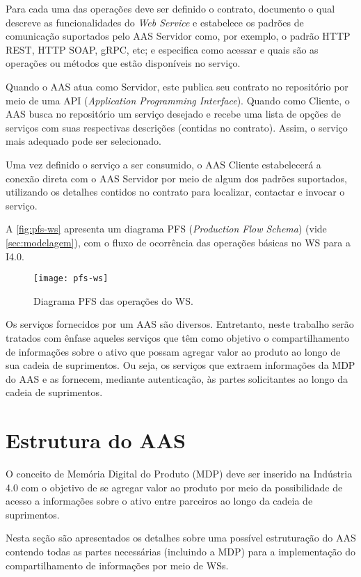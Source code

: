 Para cada uma das operações deve ser definido o contrato, documento o qual descreve as funcionalidades do \textit{Web Service} e estabelece os padrões de comunicação suportados pelo AAS Servidor como, por exemplo, o padrão HTTP REST, HTTP SOAP, gRPC, etc; e especifica como acessar e quais são as operações ou métodos que estão disponíveis no serviço.

Quando o AAS atua como Servidor, este publica seu contrato no repositório por meio de uma API (\textit{Application Programming Interface}). Quando como Cliente, o AAS busca no repositório um serviço desejado e recebe uma lista de opções de serviços com suas respectivas descrições (contidas no contrato). Assim, o serviço mais adequado pode ser selecionado.

Uma vez definido o serviço a ser consumido, o AAS Cliente estabelecerá a conexão direta com o AAS Servidor por meio de algum dos padrões suportados, utilizando os detalhes contidos no contrato para localizar, contactar e invocar o serviço.

A \autoref{fig:pfs-ws} apresenta um diagrama PFS (\textit{Production Flow Schema}) (vide \autoref{sec:modelagem}), com o fluxo de ocorrência das operações básicas no WS para a I4.0.

\begin{figure}[htb]
	\centering
	\texttt{[image: pfs-ws]}
	\caption{Diagrama PFS das operações do WS.}
	\label{fig:pfs-ws}
\end{figure}

Os serviços fornecidos por um AAS são diversos. Entretanto, neste trabalho serão tratados com ênfase aqueles serviços que têm como objetivo o compartilhamento de informações sobre o ativo que possam agregar valor ao produto ao longo de sua cadeia de suprimentos. Ou seja, os serviços que extraem informações da MDP do AAS e as fornecem, mediante autenticação, às partes solicitantes ao longo da cadeia de suprimentos.

\section{Estrutura do AAS}

O conceito de Memória Digital do Produto (MDP) deve ser inserido na Indústria 4.0 com o objetivo de se agregar valor ao produto por meio da possibilidade de acesso a informações sobre o ativo entre parceiros ao longo da cadeia de suprimentos.

Nesta seção são apresentados os detalhes sobre uma possível estruturação do AAS contendo todas as partes necessárias (incluindo a MDP) para a implementação do compartilhamento de informações por meio de WSs.

